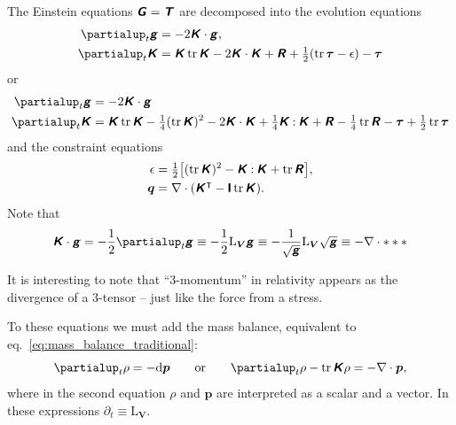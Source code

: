 \documentclass[\ifafour a4paper,12pt,\else a5paper,10pt,\fi%
onecolumn,oneside,article,%
british%
]{memoir}
\theoremstyle{remark}
\theoremstyle{innote}
\newcommand*{\mathte}[1]{\textbf{\textit{\textsf{#1}}}}
\newcommand*{\de}{\partialup}%
\newcommand*{\di}{\mathrm{d}}%
\DeclareMathOperator{\tr}{tr}%
\newcommand*{\con}{\mathbin{:}}%
\renewcommand*{\|}{\nonscript\,\vert\nonscript\;\mathopen{}}
\newcommand*{\eqn}{eq.}%
\newcommand*{\T}{^\intercal}%
\newcommand*{\Li}{\mathrm{L}}
\newcommand*{\ydd}{\rho}
\newcommand*{\yd}{\ydd}
\newcommand*{\yjj}{p}
\newcommand*{\yj}{\bm{\yjj}}
\newcommand*{\yGG}{G}
\newcommand*{\yG}{\mathte{\yGG}}
\newcommand*{\yTT}{\tau}
\newcommand*{\yT}{\bm{\yTT}}
\newcommand*{\yTTf}{T}
\newcommand*{\yTf}{\mathte{\yTTf}}
\newcommand*{\ynn}{V}
\newcommand*{\yn}{\bm{\ynn}}
\newcommand*{\ygg}{g}
\newcommand*{\yg}{\mathte{\ygg}}
\newcommand*{\yKK}{K}
\newcommand*{\yK}{\mathte{\yKK}}
\newcommand*{\yRR}{R}
\newcommand*{\yR}{\mathte{\yRR}}
\newcommand*{\ypp}{q}
\newcommand*{\yp}{\bm{\ypp}}
\newcommand*{\ye}{\epsilon}
\newcommand*{\ynab}{\nabla}
\newcommand*{\yI}{\textsf{\textbf{I}}}
\begin{document}
The Einstein equations $\yG = \yTf$ are decomposed into the evolution
equations
\begin{subequations}\label{eq:evolution_eqns}
  \begin{align}
    \label{eq:dt_metric}
    \de_t \yg &= -2\yK\cdot\yg,
    \\
    \label{eq:dt_curvat}
    \de_t \yK &=  \yK\tr\yK -2 \yK\cdot\yK +\yR + \tfrac{1}{2}(\tr\yT-\ye) - \yT
  \end{align}
\end{subequations}
or
\begin{subequations}\label{eq:evolution_eqns2}
  \begin{align}
    \label{eq:dt_metric2}
    \de_t \yg &= -2\yK\cdot\yg
    \\
    \label{eq:dt_curvat2}
    \de_t \yK &=  \yK\tr\yK-\tfrac{1}{4}(\tr\yK)^2
                -2 \yK\cdot\yK + \tfrac{1}{4}\yK\con\yK
                +\yR -\tfrac{1}{4}\tr\yR
                -\yT+ \tfrac{1}{2}\tr\yT
  \end{align}
\end{subequations}
and the constraint equations
\begin{subequations}\label{eq:constraint_eqns}
  \begin{align}
    \label{eq:energy_constraint}
    \ye &=\tfrac{1}{2}\bigl[(\tr\yK)^2 - \yK\con\yK + \tr\yR\bigr],
    \\
    \label{eq:momentum_constraint}
    \yp &= \ynab\cdot(\yK\T - \yI\tr\yK).
  \end{align}
\end{subequations}
Note that
\begin{equation}
  \label{eq:curvature_stretching}
  \yK\cdot\yg = -\frac{1}{2}\de_t\yg \equiv
  -\frac{1}{2}  \Li_{\yn}\yg \equiv
  -\frac{1}{\sqrt{\yg}}\Li_{\yn}\sqrt{\yg} \equiv -\ynab\cdot ***
\end{equation}

It is interesting to note that \enquote{3-momentum} in relativity appears
as the divergence of a 3-tensor -- just like the force from a stress.

To these equations we must add the mass balance, equivalent to
\eqn~\eqref{eq:mass_balance_traditional}:
\begin{equation}
  \label{eq:mass_balance_gen-rel}
  \de_t\yd = - \di\yj
  \qquad\text{or}\qquad
  \de_t\yd -\tr\yK\yd = -\ynab\cdot\yj,
\end{equation}
where in the second equation $\yd$ and $\yj$ are interpreted as a scalar
and a vector. In these expressions $\de_t \equiv \Li_{\yn}$.
\end{document}
